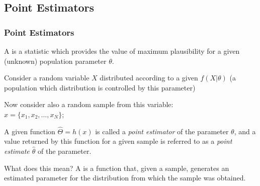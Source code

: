 \documentclass[10pt]{beamer}
\begin{document}
\subsection{Point Estimators}
\begin{frame}
  \frametitle{Point Estimators}

  A  is a statistic which provides the
  value of maximum plausibility for a given (unknown) population
  parameter $\theta$.

  \medskip

  Consider a random variable $X$ distributed according to a given
  $f(X|\theta)$ (a population which distribution is controlled by this
  parameter)

  \medskip

  Now consider also a random sample from this variable:\\
  $x = \{x_1,x_2,\dots,x_N\}$;

  \medskip

  A given function $\hat{\Theta} = h(x)$ is called a \emph{point
    estimator} of the parameter $\theta$, and a value returned by this
  function for a given sample is referred to as a \emph{point estimate
    $\hat{\theta}$} of the parameter.
  
  \medskip

  \begin{block}{What does this mean?}
    A  is a function that, given a sample,
    generates an estimated parameter for the distribution from which
    the sample was obtained. 
  \end{block}

\end{frame}
\end{document}
